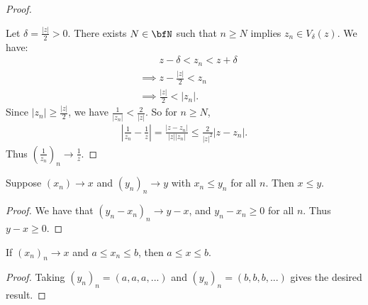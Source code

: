 \begin{proof}
\begin{center}
                    \end{center}
                Let $\delta = \frac{|z|}{2} > 0$. There exists $N \in \bfN$ such that $n \geq N$ implies $z_n \in V_\delta(z)$. We have:
                    \begin{equation*}
                    \begin{split}
                        &\phantom{\implies} z - \delta < z_n < z + \delta \\
                        &\implies z - \frac{|z|}{2} < z_n \\
                        & \implies \frac{|z|}{2} < |z_n|.
                    \end{split}
                    \end{equation*}
                Since $|z_n| \geq \frac{|z|}{2}$, we have $\frac{1}{|z_n|} < \frac{2}{|z|}$. So for $n \geq N$, 
                    \begin{equation*}
                    \begin{split}
                        \left|\frac{1}{z_n} - \frac{1}{z}\right| = \frac{|z- z_n|}{|z||z_n|} \leq \frac{2}{|z|^2}|z - z_n|.
                    \end{split}
                    \end{equation*}
                Thus $\left(\frac{1}{z_n}\right)_n \rightarrow \frac{1}{z}$.
            \end{proof}
    
        \begin{theorem}\label{thm:ordering-of-sequences}
            Suppose $(x_n) \rightarrow x$ and $(y_n)_n \rightarrow y$ with $x_n \leq y_n$ for all $n$. Then $x \leq y$.
        \end{theorem}
            \begin{proof}
                We have that $(y_n - x_n)_n \rightarrow y-x$, and $y_n - x_n \geq 0$ for all $n$. Thus $y - x \geq 0$.
            \end{proof}
    
        \begin{corollary}
            If $(x_n)_n \rightarrow x$ and $a \leq x_n \leq b$, then $a \leq x \leq b$.
        \end{corollary}
            \begin{proof}
                Taking $(y_n)_n = (a,a,a,...)$ and $(y_n)_n = (b,b,b,...)$ gives the desired result.
            \end{proof}
    
